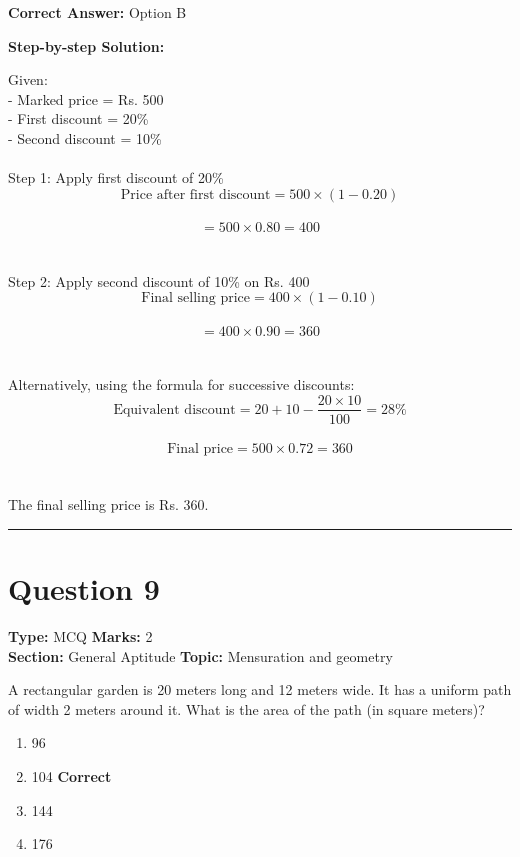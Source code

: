 \documentclass[11pt]{article}
\begin{document}
\textbf{Correct Answer:} Option B

\textbf{Step-by-step Solution:}

Given:\\
 - Marked price = Rs. 500\\
 - First discount = 20\%\\
 - Second discount = 10\%\\
\\
 Step 1: Apply first discount of 20\%\\
 \[\text{Price after first discount} = 500 \times (1 - 0.20)\]\\
 \[= 500 \times 0.80 = 400\]\\
\\
 Step 2: Apply second discount of 10\% on Rs. 400\\
 \[\text{Final selling price} = 400 \times (1 - 0.10)\]\\
 \[= 400 \times 0.90 = 360\]\\
\\
 Alternatively, using the formula for successive discounts:\\
 \[\text{Equivalent discount} = 20 + 10 - \frac{20 \times 10}{100} = 28\%\]\\
 \[\text{Final price} = 500 \times 0.72 = 360\]\\
\\
 The final selling price is Rs. 360.

\vspace{0.8em}
\hrule
\vspace{0.4em}
\section*{Question 9}
\textbf{Type:} MCQ \hfill \textbf{Marks:} 2\\
\textbf{Section:} General Aptitude \hfill \textbf{Topic:} Mensuration and geometry

A rectangular garden is 20 meters long and 12 meters wide. It has a uniform path of width 2 meters around it. What is the area of the path (in square meters)?


\begin{enumerate}[label=\textbf{\Alph*.}, leftmargin=1.8em]
\item 96\item 104 \hfill {\color{gategreen}\textbf{Correct}}\item 144\item 176\end{enumerate}
\end{document}
